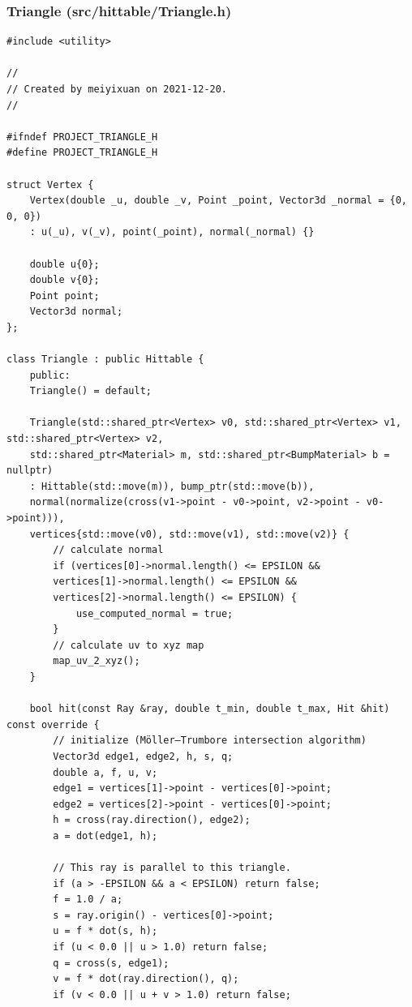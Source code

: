 \documentclass[utf8]{article}
\begin{document}
\subsubsection{Triangle (src/hittable/Triangle.h)}
\begin{lstlisting}[style=CStyle]
#include <utility>

//
// Created by meiyixuan on 2021-12-20.
//

#ifndef PROJECT_TRIANGLE_H
#define PROJECT_TRIANGLE_H

struct Vertex {
	Vertex(double _u, double _v, Point _point, Vector3d _normal = {0, 0, 0})
	: u(_u), v(_v), point(_point), normal(_normal) {}
	
	double u{0};
	double v{0};
	Point point;
	Vector3d normal;
};

class Triangle : public Hittable {
	public:
	Triangle() = default;
	
	Triangle(std::shared_ptr<Vertex> v0, std::shared_ptr<Vertex> v1, std::shared_ptr<Vertex> v2,
	std::shared_ptr<Material> m, std::shared_ptr<BumpMaterial> b = nullptr)
	: Hittable(std::move(m)), bump_ptr(std::move(b)),
	normal(normalize(cross(v1->point - v0->point, v2->point - v0->point))),
	vertices{std::move(v0), std::move(v1), std::move(v2)} {
		// calculate normal
		if (vertices[0]->normal.length() <= EPSILON &&
		vertices[1]->normal.length() <= EPSILON &&
		vertices[2]->normal.length() <= EPSILON) {
			use_computed_normal = true;
		}
		// calculate uv to xyz map
		map_uv_2_xyz();
	}
	
	bool hit(const Ray &ray, double t_min, double t_max, Hit &hit) const override {
		// initialize (Möller–Trumbore intersection algorithm)
		Vector3d edge1, edge2, h, s, q;
		double a, f, u, v;
		edge1 = vertices[1]->point - vertices[0]->point;
		edge2 = vertices[2]->point - vertices[0]->point;
		h = cross(ray.direction(), edge2);
		a = dot(edge1, h);
		
		// This ray is parallel to this triangle.
		if (a > -EPSILON && a < EPSILON) return false;
		f = 1.0 / a;
		s = ray.origin() - vertices[0]->point;
		u = f * dot(s, h);
		if (u < 0.0 || u > 1.0) return false;
		q = cross(s, edge1);
		v = f * dot(ray.direction(), q);
		if (v < 0.0 || u + v > 1.0) return false;
		

\end{lstlisting}
\end{document}
